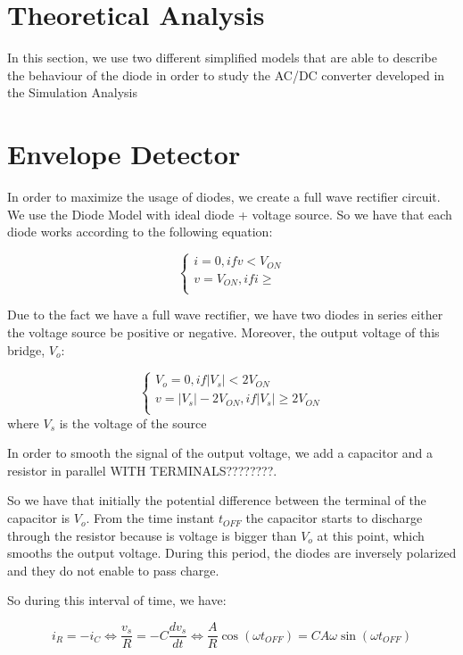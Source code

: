 \section{Theoretical Analysis}
\label{sec:analysis}

In this section, we use two different simplified models that are able to describe the behaviour of the diode
in order to study the AC/DC converter developed in the Simulation Analysis


\section{Envelope Detector}

In order to maximize the usage of diodes, we create a full wave rectifier circuit. We use the Diode Model with ideal diode + voltage source.
So we have that each diode works according to the following equation:


\[
  \left\{
  \begin{array}{ll}
    i = 0, if v < V_{ON}   \\
    v = V_{ON}, if  i \geq \\
  \end{array}
  \right.
\]

Due to the fact we have a full wave rectifier, we have two diodes in series either the voltage source be positive or negative.
Moreover, the output voltage of this bridge, $V_o$:

\[
  \left\{
  \begin{array}{ll}
    V_o = 0,  if  |V_s| < 2V_{ON}               \\
    v = |V_s| - 2 V_{ON}, if |V_s| \geq 2V_{ON} \\
  \end{array}
  \right.
\] where $V_s$ is the voltage of the source

In order to smooth the signal of the output voltage, we add a capacitor and a resistor in parallel
WITH TERMINALS????????.

So we have that initially the potential difference between the terminal of the capacitor is $V_o$. From the time instant $t_{OFF}$
the capacitor starts to discharge through the resistor because is voltage is bigger than $V_o$ at this point, which smooths the output voltage.
During this period, the diodes are inversely polarized and they do not enable to pass charge.

So during this interval of time, we have:

\begin{equation}
  i_R = - i_C \Leftrightarrow \frac{v_s}{R} = -C\frac{dv_s}{dt} \Leftrightarrow \frac{A}{R}\cos(\omega t_{OFF}) = C A \omega \sin(\omega t_{OFF})
\end{equation}

